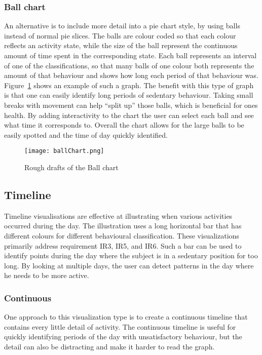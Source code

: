 \subsubsection{Ball chart}
An alternative is to include more detail into a pie chart style, by using balls instead of normal pie slices. The balls are colour coded so that each colour reflects an activity state, while the size of the ball represent the continuous amount of time spent in the corresponding state. Each ball represents an interval of one of the classifications, so that many balls of one colour both represents the amount of that behaviour and shows how long each period of that behaviour was. Figure~\ref{fig:ballChart} shows an example of such a graph. The benefit with this type of graph is that one can easily identify long periods of sedentary behaviour. Taking small breaks with movement can help ``split up'' those balls, which is beneficial for ones health. By adding interactivity to the chart the user can select each ball and see what time it corresponds to. Overall the chart allows for the large balls to be easily spotted and the time of day quickly identified.

\begin{figure}[h!]
	\centering
		\texttt{[image: ballChart.png]}
		\caption{\footnotesize Rough drafts of the Ball chart}
		\label{fig:ballChart}
\end{figure}

\subsection{Timeline}
Timeline visualisations are effective at illustrating when various activities occurred during the day. The illustration uses a long horizontal bar that has different colours for different behavioural classification. These visualizations primarily address requirement IR3, IR5, and IR6. Such a bar can be used to identify points during the day where the subject is in a sedentary position for too long. By looking at multiple days, the user can detect patterns in the day where he needs to be more active.

\subsubsection{Continuous}
One approach to this visualization type is to create a continuous timeline that contains every little detail of activity. The continuous timeline is useful for quickly identifying periods of the day with unsatisfactory behaviour, but the detail can also be distracting and make it harder to read the graph.

